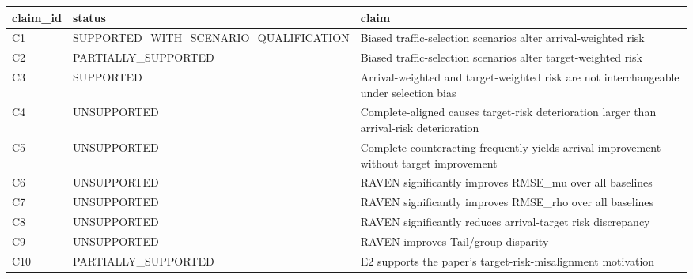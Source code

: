\begin{tabular}{lll}
\toprule
claim_id & status & claim \\
\midrule
C1 & SUPPORTED_WITH_SCENARIO_QUALIFICATION & Biased traffic-selection scenarios alter arrival-weighted risk \\
C2 & PARTIALLY_SUPPORTED & Biased traffic-selection scenarios alter target-weighted risk \\
C3 & SUPPORTED & Arrival-weighted and target-weighted risk are not interchangeable under selection bias \\
C4 & UNSUPPORTED & Complete-aligned causes target-risk deterioration larger than arrival-risk deterioration \\
C5 & UNSUPPORTED & Complete-counteracting frequently yields arrival improvement without target improvement \\
C6 & UNSUPPORTED & RAVEN significantly improves RMSE_mu over all baselines \\
C7 & UNSUPPORTED & RAVEN significantly improves RMSE_rho over all baselines \\
C8 & UNSUPPORTED & RAVEN significantly reduces arrival-target risk discrepancy \\
C9 & UNSUPPORTED & RAVEN improves Tail/group disparity \\
C10 & PARTIALLY_SUPPORTED & E2 supports the paper's target-risk-misalignment motivation \\
\bottomrule
\end{tabular}
